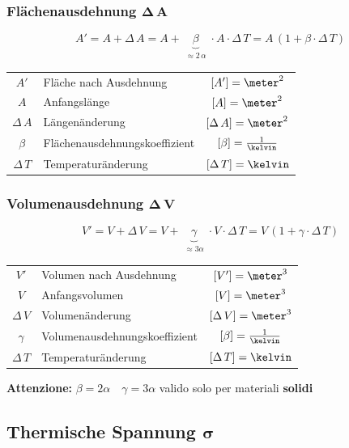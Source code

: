 \subsubsection{Flächenausdehnung $\bm{\Delta \, A}$}

\vspace{-0.2cm}

$$ \boxed{ A' = A + \Delta \,  A = A + \underbrace{  \beta }_{\substack{\approx 2 \, \alpha}}  \cdot A \cdot \Delta \, T = A \, (1 + \beta \cdot \Delta \, T ) } $$


\begin{tabular}{c l c}
		$A'$ 			& Fläche nach Ausdehnung 		& $[A'] = \meter^2$ 			\\
		$A$ 			& Anfangslänge 					& $[A] = \meter^2$ 				\\
		$\Delta \, A$	& Längenänderung 				& $[\Delta \, A] = \meter^2$ 	\\
		$\beta$ 		& Flächenausdehnungskoeffizient & $[\beta] = \frac{1}{\kelvin}$ \\ 
		$\Delta \, T $ 	& Temperaturänderung 			& $[\Delta \, T ] = \kelvin$
\end{tabular}


\subsubsection{Volumenausdehnung $\bm{\Delta \, V}$}

\vspace{-0.2cm}

$$ \boxed{ V' = V + \Delta \,  V = V + \underbrace{  \gamma }_{\substack{\approx 3\alpha}}  \cdot V \cdot \Delta \, T = V \, (1 + \gamma \cdot \Delta \, T ) }$$


\begin{tabular}{c l c}
		$V'$ 			& Volumen nach Ausdehnung 		& $[V'] = \meter^3$ 			\\
		$V$ 			& Anfangsvolumen 				& $[V] = \meter^3$ 				\\
		$\Delta \, V$ 	& Volumenänderung 				& $[\Delta \, V] = \meter^3$ 	\\
		$\gamma$ 		& Volumenausdehnungskoeffizient & $[\beta] = \frac{1}{\kelvin}$ \\ 
		$\Delta \, T$ 	& Temperaturänderung 			& $[\Delta \, T ] = \kelvin$
\end{tabular}\medskip

\textbf{Attenzione:} $\beta = 2\alpha \quad \gamma = 3\alpha$ valido solo per materiali \textbf{solidi}

\subsection[Thermische Spannung]{Thermische Spannung $\bm{\sigma}$}

